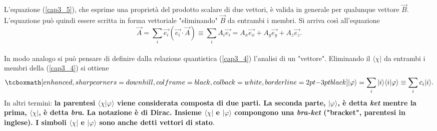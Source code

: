 \documentclass[a4paper,12pt,oneside]{book}
\begin{document}
L'equazione (\ref{cap3_5}), che esprime una proprietà del prodotto scalare di due vettori, è valida in generale per qualunque vettore $\vec{B}$. L'equazione può quindi essere scritta in forma vettoriale "eliminando" $\vec{B}$ da entrambi i membri. Si arriva così all'equazione 
	\begin{equation}
		\vec{A} = \sum \limits_{i} \vec{e_i} (\vec{e_i}\cdot\vec{A}) \equiv \sum \limits_{i} A_i\vec{e_i}= A_x\vec{e_x}+A_y\vec{e_y}+A_z\vec{e_z} .
	\end{equation}\\
	
In modo analogo si può pensare di definire dalla relazione quantistica (\ref{cap3_4}) l'analisi di un "vettore". Eliminando il $\langle \chi |$ da entrambi i membri della (\ref{cap3_4}) si ottiene
	\begin{equation}
		\tcboxmath[enhanced, sharp corners=downhill, colframe=black, colback=white, borderline={2pt}{-3pt}{black}]{
 			| \varphi \rangle= \sum \limits_{i} | i \rangle \langle i | \varphi \rangle \equiv \sum \limits_{i} c_i | i \rangle .
 			}
	\label{cap3_8}
	\end{equation}
In altri termini: \textbf{la parentesi $\langle \chi | \varphi \rangle $ viene considerata composta di due parti. La seconda parte, $| \varphi \rangle $, è detta \emph{ket} mentre la prima, $\langle \chi |$, è detta \emph{bra}. La notazione è di Dirac. Insieme $\langle \chi |$ e $| \varphi \rangle$ compongono una \emph{bra-ket} ("bracket", parentesi in inglese). I simboli $\langle \chi |$ e $| \varphi \rangle$ sono anche detti vettori di stato}.\\
\end{document}
